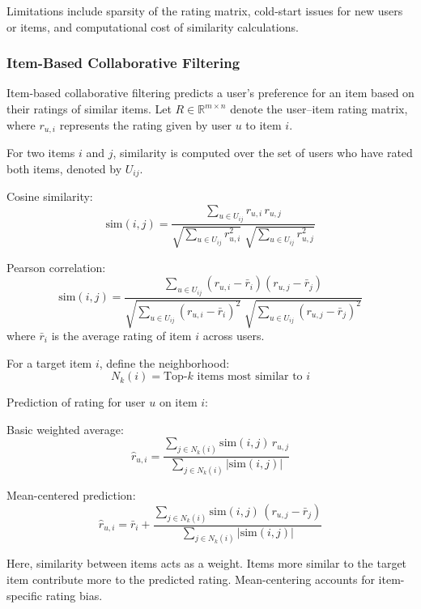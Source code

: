 \documentclass[10pt,a4paper]{article}
\begin{document}
	Limitations include sparsity of the rating matrix, cold-start issues for new users or items, and computational cost of similarity calculations.

	\subsubsection{Item-Based Collaborative Filtering}
	Item-based collaborative filtering predicts a user's preference for an item based on their ratings of similar items. Let $R \in \mathbb{R}^{m \times n}$ denote the user--item rating matrix, where $r_{u,i}$ represents the rating given by user $u$ to item $i$.

	\vspace{0.3em}

	For two items $i$ and $j$, similarity is computed over the set of users who have rated both items, denoted by $U_{ij}$.

	Cosine similarity:
	\[
	\text{sim}(i,j) =
	\frac{\sum_{u \in U_{ij}} r_{u,i}\, r_{u,j}}
	{\sqrt{\sum_{u \in U_{ij}} r_{u,i}^2}\;
		\sqrt{\sum_{u \in U_{ij}} r_{u,j}^2}}
	\]

	Pearson correlation:
	\[
	\text{sim}(i,j) =
	\frac{\sum_{u \in U_{ij}} (r_{u,i} - \bar{r}_i)(r_{u,j} - \bar{r}_j)}
	{\sqrt{\sum_{u \in U_{ij}} (r_{u,i} - \bar{r}_i)^2}\;
		\sqrt{\sum_{u \in U_{ij}} (r_{u,j} - \bar{r}_j)^2}}
	\]
	where $\bar{r}_i$ is the average rating of item $i$ across users.

	\vspace{0.3em}

	For a target item $i$, define the neighborhood:
	\[
	N_k(i) = \text{Top-}k \text{ items most similar to } i
	\]

	\vspace{0.3em}

	Prediction of rating for user $u$ on item $i$:

	Basic weighted average:
	\[
	\hat{r}_{u,i} =
	\frac{\sum_{j \in N_k(i)} \text{sim}(i,j)\, r_{u,j}}
	{\sum_{j \in N_k(i)} |\text{sim}(i,j)|}
	\]

	Mean-centered prediction:
	\[
	\hat{r}_{u,i} =
	\bar{r}_i +
	\frac{\sum_{j \in N_k(i)} \text{sim}(i,j)\, (r_{u,j} - \bar{r}_j)}
	{\sum_{j \in N_k(i)} |\text{sim}(i,j)|}
	\]

	\vspace{0.3em}

	Here, similarity between items acts as a weight. Items more similar to the target item contribute more to the predicted rating. Mean-centering accounts for item-specific rating bias.
\end{document}
